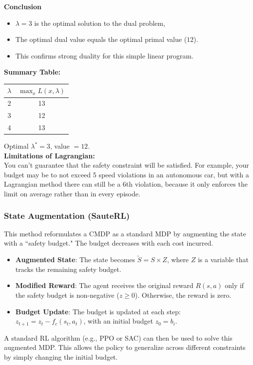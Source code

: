 \documentclass[12pt]{article}
\begin{document}
\textbf{Conclusion}

\begin{itemize}
    \item $\lambda = 3$ is the optimal solution to the dual problem,
    \item The optimal dual value equals the optimal primal value ($12$).
    \item This confirms strong duality for this simple linear program.
\end{itemize}

\textbf{Summary Table:} \\ 

\begin{tabular}{|c|c|}
\hline
$\lambda$ & $\max_x L(x, \lambda)$ \\
\hline
2 & 13 \\
\hline
3 & 12 \\
\hline
4 & 13 \\
\hline
\end{tabular}

Optimal $\lambda^* = 3$, value $=12$. \\ 

\textbf{Limitations of Lagrangian:} \\ 
You can't guarantee that the safety constraint will be satisfied. For example, your budget may be to not exceed 5 speed violations in an autonomous car, but with a Lagrangian method there can still be a 6th violation, because it only enforces the limit on average rather than in every episode.
\subsubsection{State Augmentation (SauteRL)}
This method reformulates a CMDP as a standard MDP by augmenting the state with a ``safety budget." The budget decreases with each cost incurred.
\begin{itemize}
    \item \textbf{Augmented State}: The state becomes $\tilde{S} = S \times Z$, where $Z$ is a variable that tracks the remaining safety budget.
    \item \textbf{Modified Reward}: The agent receives the original reward $R(s, a)$ only if the safety budget is non-negative ($z \geq 0$). Otherwise, the reward is zero.
    \item \textbf{Budget Update}: The budget is updated at each step: $z_{t+1} = z_t - f_c(s_t, a_t)$, with an initial budget $z_0 = b_i$.
\end{itemize}
A standard RL algorithm (e.g., PPO or SAC) can then be used to solve this augmented MDP. This allows the policy to generalize across different constraints by simply changing the initial budget.
\end{document}
